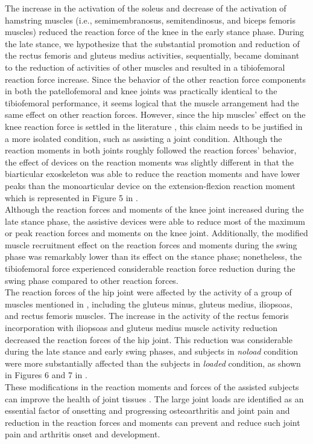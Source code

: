 \documentclass[10pt,letterpaper]{article}
\begin{document}
The increase in the activation of the soleus and decrease of the activation of hamstring muscles (i.e., semimembranosus, semitendinosus, and biceps femoris muscles) reduced the reaction force of the knee in the early stance phase. During the late stance, we hypothesize that the substantial promotion and reduction of the rectus femoris and gluteus medius activities, sequentially, became dominant to the reduction of activities of other muscles and resulted in a tibiofemoral reaction force increase. Since the behavior of the other reaction force components in both the patellofemoral and knee joints was practically identical to the tibiofemoral performance, it seems logical that the muscle arrangement had the same effect on other reaction forces. However, since the hip muscles' effect on the knee reaction force is settled in the literature \cite{170,171}, this claim needs to be justified in a more isolated condition, such as assisting a joint condition. Although the reaction moments in both joints roughly followed the reaction forces' behavior, the effect of devices on the reaction moments was slightly different in that the biarticular exoskeleton was able to reduce the reaction moments and have lower peaks than the monoarticular device on the extension-flexion reaction moment which is represented in Figure 5 in .\\
Although the reaction forces and moments of the knee joint increased during the late stance phase, the assistive devices were able to reduce most of the maximum or peak reaction forces and moments on the knee joint. Additionally, the modified muscle recruitment effect on the reaction forces and moments during the swing phase was remarkably lower than its effect on the stance phase; nonetheless, the tibiofemoral force experienced considerable reaction force reduction during the swing phase compared to other reaction forces.\\
The reaction forces of the hip joint were affected by the activity of a group of muscles mentioned in \cite{170}, including the gluteus minus, gluteus medius, iliopsoas, and rectus femoris muscles. The increase in the activity of the rectus femoris incorporation with iliopsoas and gluteus medius muscle activity reduction decreased the reaction forces of the hip joint. This reduction was considerable during the late stance and early swing phases, and subjects in {\it noload} condition were more substantially affected than the subjects in {\it loaded} condition, as shown in Figures 6 and 7 in . \\
These modifications in the reaction moments and forces of the assisted subjects can improve the health of joint tissues \cite{178}. The large joint loads are identified as an essential factor of onsetting and progressing osteoarthritis \cite{172,176,177} and joint pain \cite{175} and reduction in the reaction forces and moments can prevent and reduce such joint pain and arthritis onset and development.
\end{document}

